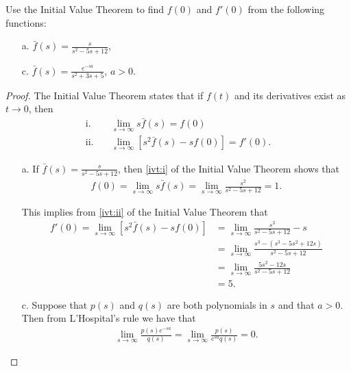 \begin{problem}{3.27}
  Use the Initial Value Theorem to find $f(0)$ and $f'(0)$ from the following functions:
  \begin{enumerate}
    \item[a.] $\displaystyle \bar{f}(s) = \frac{s}{s^2 - 5s + 12}$,
    \item[c.] $\displaystyle \bar{f}(s) = \frac{e^{-s a}}{s^2+3s+5}$, $a > 0$.
  \end{enumerate}
\end{problem}

\begin{proof}
  The Initial Value Theorem states that if $f(t)$ and its derivatives exist as $t\to 0$, then
  \begin{subequations}
    \begin{align}
      \text{i.}\quad&\lim_{s\to \infty} s \bar{f}(s) = f(0) \label{ivt:i}\\
      \text{ii.}\quad&\lim_{s\to\infty} [s^2 \bar{f}(s) - s f(0)] = f'(0) \label{ivt:ii}.
    \end{align}
  \end{subequations}

  \begin{enumerate}
    \item[a.] If $\displaystyle \bar{f}(s) = \frac{s}{s^2 - 5s + 12}$, then \eqref{ivt:i} of the Initial Value Theorem
      shows that
      \begin{align*}
        f(0) = \lim_{s\to \infty} s \bar{f}(s) = \lim_{s\to\infty}  \frac{s^2}{s^2 - 5s + 12} = 1.
      \end{align*}

      This implies from \eqref{ivt:ii} of the Initial Value Theorem that
      \begin{align*}
        f'(0) = \lim_{s\to\infty} [s^2 \bar{f}(s) - s f(0)]
        &= \lim_{s\to\infty} \frac{s^3}{s^2 -5s + 12} - s \\
        &= \lim_{s\to\infty} \frac{s^3 - (s^3 - 5s^2 + 12s)}{s^2 -5s + 12} \\
        &= \lim_{s\to\infty} \frac{5s^2 - 12s}{s^2 -5s + 12} \\
        &= 5.
      \end{align*}
    \item[c.] Suppose that $p(s)$ and $q(s)$ are both polynomials in $s$ and that $a > 0$. Then from L'Hospital's rule we have that
      \begin{align}\label{lhosp}
        \lim_{s\to\infty} \frac{p(s) e^{-s a}}{q(s)} = \lim_{s\to\infty} \frac{p(s)}{e^{sa} q(s)} = 0.
      \end{align}


\end{enumerate}
\end{proof}
